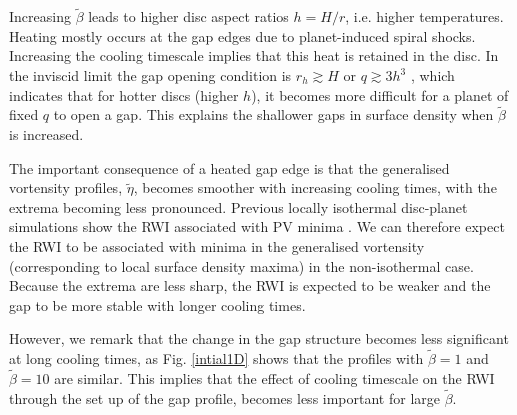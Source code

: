 Increasing $\tilde\beta$ leads to higher disc aspect ratios $h=H/r$,
i.e. higher temperatures. Heating mostly occurs at the gap edges
due to planet-induced spiral shocks. Increasing the cooling timescale 
implies that this heat is retained in the disc. In the inviscid limit the gap
opening condition is $r_h\gtrsim H$ or $q\gtrsim 3h^3$
\citep{crida06}, which indicates that for hotter discs (higher
$h$), it becomes more difficult for a planet of fixed $q$ to open a
gap. This explains the shallower gaps in surface density when
$\tilde{\beta}$ is increased. 


The important consequence of a heated gap edge is that the
generalised vortensity profiles, $\tilde{\eta}$, becomes smoother with increasing
cooling times, with the extrema becoming less pronounced. Previous locally
isothermal disc-planet simulations show the RWI associated with PV
minima \citep{li05,lin10}. We can therefore expect the RWI to be associated with
minima in the generalised vortensity (corresponding to local surface
density maxima) in the non-isothermal case. Because the extrema are
less sharp, the RWI is expected to be weaker and the gap to be more
stable with longer cooling times.  


However, we remark that the change in the gap structure becomes less 
significant at long cooling times, as Fig. \ref{intial1D} shows that
the profiles with $\tilde{\beta}=1$ and $\tilde{\beta}=10$ are 
similar. This implies that the effect of cooling timescale on the
RWI through the set up of the gap profile, becomes less important for
large $\tilde{\beta}$. 


